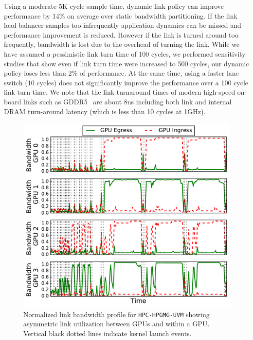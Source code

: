 Using a moderate 5K cycle sample time, dynamic link policy can improve performance
by 14\% on average over static bandwidth partitioning. If the link load
balancer samples too infrequently application dynamics can be missed
and performance improvement is reduced. However if the link is turned around
too frequently, bandwidth is lost due to the overhead of turning the link.
While we have assumed a pessimistic link turn time of 100 cycles, we performed
sensitivity studies that show even if link turn time were increased to 500
cycles, our dynamic policy loses less than 2\% of performance. 
At the same time, using a faster lane switch (10 cycles) does not
significantly improve the performance over a 100 cycle link turn time.
We note that the link
turnaround times of modern high-speed on-board links such as
GDDR5~\cite{hynixgddr51Gb} are about 8ns including both link and internal 
DRAM turn-around latency (which is less than 10 cycles at 1GHz).

\begin{figure}[t]
    \centering
    
\includegraphics[width=1.0\columnwidth]{figures/bw_profile_HPGMG_UVM_base.pdf}
    \caption{Normalized link bandwidth profile for \texttt{HPC-HPGMG-UVM} 
showing asymmetric link utilization between GPUs and within a GPU. Vertical black 
dotted lines indicate kernel launch events.}
    \label{fig:link-motivation}
    \vspace{-.2in}
\end{figure}

